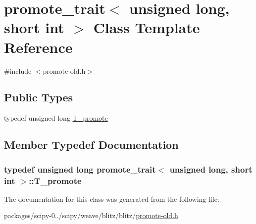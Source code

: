 \hypertarget{classpromote__trait_3_01unsigned_01long_00_01short_01int_01_4}{}\section{promote\+\_\+trait$<$ unsigned long, short int $>$ Class Template Reference}
\label{classpromote__trait_3_01unsigned_01long_00_01short_01int_01_4}


{\ttfamily \#include $<$promote-\/old.\+h$>$}

\subsection*{Public Types}
\begin{DoxyCompactItemize}
\item 
typedef unsigned long \hyperlink{classpromote__trait_3_01unsigned_01long_00_01short_01int_01_4_a55ddd1bdff83b5bd149dad6a67da9dbe}{T\+\_\+promote}
\end{DoxyCompactItemize}


\subsection{Member Typedef Documentation}
\hypertarget{classpromote__trait_3_01unsigned_01long_00_01short_01int_01_4_a55ddd1bdff83b5bd149dad6a67da9dbe}{}
\subsubsection[{T\+\_\+promote}]{\setlength{\rightskip}{0pt plus 5cm}typedef unsigned long {\bf promote\+\_\+trait}$<$ unsigned long, short int $>$\+::{\bf T\+\_\+promote}}\label{classpromote__trait_3_01unsigned_01long_00_01short_01int_01_4_a55ddd1bdff83b5bd149dad6a67da9dbe}


The documentation for this class was generated from the following file\+:\begin{DoxyCompactItemize}
\item 
packages/scipy-\/0../scipy/weave/blitz/blitz/\hyperlink{promote-old_8h}{promote-\/old.\+h}\end{DoxyCompactItemize}
